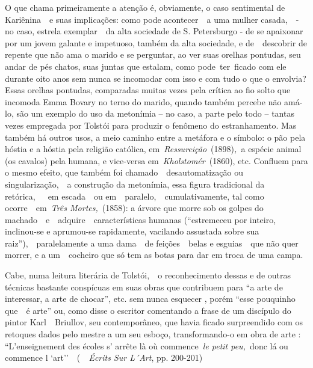 O que chama primeiramente a atenção é, obviamente, o caso sentimental de
Kariênina~~e suas implicações: como pode acontecer~~a uma mulher
casada,~~- no caso, estrela exemplar~~da alta sociedade de S.
Petersburgo - de se apaixonar por um jovem galante e impetuoso, também
da alta sociedade, e de~~descobrir de repente que não ama o marido e se
perguntar, ao ver suas orelhas pontudas, seu andar de pés chatos, suas
juntas que estalam, como pode~ter~ficado com ele durante oito anos sem
nunca se incomodar com isso e com tudo o que o envolvia? Essas orelhas
pontudas, comparadas muitas vezes pela crítica ao fio solto que incomoda
Emma Bovary no terno do marido, quando também percebe não amá-lo, são um
exemplo do uso da metonímia -- no caso, a parte pelo todo -- tantas
vezes empregada por Tolstói para produzir o fenômeno do estranhamento.
Mas também há outros usos, a meio caminho entre a metáfora e o símbolo:
o pão pela hóstia e a hóstia pela religião católica,
em~\emph{Ressureição}~(1898)\emph{,~}a espécie animal (os cavalos) pela
humana, e vice-versa em~\emph{Kholstomér}~(1860), etc. Confluem para o
mesmo efeito, que também foi chamado~~desautomatização ou
singularização,~~a construção da metonímia, essa figura tradicional da
retórica,~~~em escada~~ou em~~paralelo,~~cumulativamente, tal como
ocorre~~em~\emph{Três Mortes,}~(1858): a árvore que morre sob os golpes
do machado~~e~~adquire~~características humanas (``estremeceu por
inteiro, inclinou-se e aprumou-se rapidamente, vacilando assustada sobre
sua raiz''),~~paralelamente a uma dama~~de feições~~belas e esguias~~que
não quer morrer, e a um~~cocheiro que só tem as botas para dar em troca
de uma campa.

Cabe, numa leitura literária de Tolstói,~~o reconhecimento dessas e de
outras técnicas bastante conspícuas em suas obras que contribuem para
``a arte de interessar, a arte de chocar'', etc. sem nunca esquecer ,
porém ``esse pouquinho que~~é arte'' ou, como disse o escritor
comentando a frase de um discípulo do pintor Karl~~Briullov, seu
contemporâneo, que havia ficado surpreendido com os retoques dados pelo
mestre a um seu esboço, transformando-o em obra de arte :
``L'enseignement des écoles s' arrête là où commence~\emph{le petit
peu,~}donc lá ou commence l `art''~~(~\emph{~Écrits Sur L´Art}, pp.
200-201)

~

